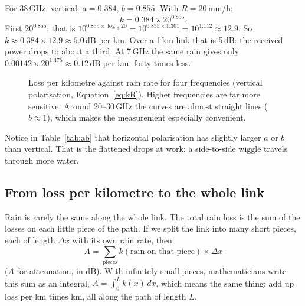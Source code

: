 \documentclass[11pt,a4paper]{article}
\begin{document}
\begin{example}
For 38\,GHz, vertical: $a = 0.384$, $b = 0.855$. With $R = 20$\,mm/h:
\[
k = 0.384 \times 20^{0.855}.
\]
First $20^{0.855}$: that is $10^{0.855\times\log_{10}20} = 10^{0.855\times1.301} = 10^{1.112} \approx 12.9$.
So $k \approx 0.384\times12.9 \approx 5.0$\,dB per km. Over a 1\,km link that is 5\,dB: the received power
drops to about a third. At 7\,GHz the same rain gives only $0.00142\times20^{1.475}\approx0.12$\,dB per km,
forty times less.
\end{example}

\begin{figure}[h]
\centering
{}
\caption{Loss per kilometre against rain rate for four frequencies (vertical polarisation,
Equation~\ref{eq:kR}). Higher frequencies are far more sensitive. Around 20--30\,GHz the curves are
almost straight lines ($b \approx 1$), which makes the measurement especially convenient.}
\label{fig:kR}
\end{figure}

Notice in Table~\ref{tab:ab} that horizontal polarisation has slightly larger $a$ or $b$ than vertical.
That is the flattened drops at work: a side-to-side wiggle travels through more water.

\subsection{From loss per kilometre to the whole link}

Rain is rarely the same along the whole link. The total rain loss is the sum of the losses on each
little piece of the path. If we split the link into many short pieces, each of length $\Delta x$ with
its own rain rate, then
\begin{equation}
A = \sum_\text{pieces} k(\text{rain on that piece}) \times \Delta x
\end{equation}
($A$ for attenuation, in dB). With infinitely small pieces, mathematicians write this sum as an integral,
$A = \int_0^L k(x)\,dx$, which means the same thing: add up loss per km times km, all along the path of
length $L$.
\end{document}
